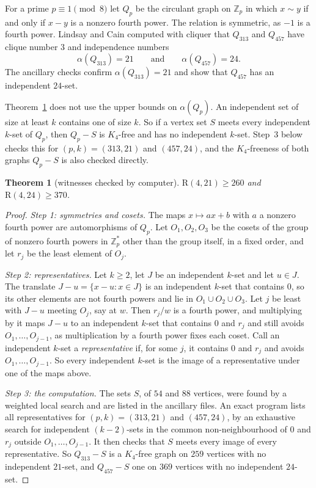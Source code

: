 \documentclass[11pt]{article}
\theoremstyle{spacedplain}
\newtheorem{theorem}{Theorem}[section]
\theoremstyle{spaceddef}
\theoremstyle{spacedremark}
\newcommand{\R}{\mathrm{R}}
\begin{document}
For a prime $p\equiv 1\pmod 8$ let $Q_p$ be the circulant graph on $\mathbb Z_p$ in which $x\sim y$ if and only if $x-y$ is a nonzero fourth power.
The relation is symmetric, as $-1$ is a fourth power.
Lindsay and Cain \cite[Proposition~2.1]{LinCa} computed with cliquer that $Q_{313}$ and $Q_{457}$ have clique number $3$ and independence numbers
\[
\alpha(Q_{313})=21 \qquad\text{and}\qquad \alpha(Q_{457})=24 .
\]
The ancillary checks confirm $\alpha(Q_{313})=21$ and show that $Q_{457}$ has an independent $24$-set.

Theorem~\ref{thm:r4k} does not use the upper bounds on $\alpha(Q_p)$.
An independent set of size at least $k$ contains one of size $k$.
So if a vertex set $S$ meets every independent $k$-set of $Q_p$, then $Q_p-S$ is $K_4$-free and has no independent $k$-set.
Step~3 below checks this for $(p,k)=(313,21)$ and $(457,24)$, and the $K_4$-freeness of both graphs $Q_p-S$ is also checked directly.

\begin{theorem}[witnesses checked by computer]\label{thm:r4k}
$\R(4,21)\ge 260$ and $\R(4,24)\ge 370$.
\end{theorem}

\begin{proof}
\emph{Step 1: symmetries and cosets.}
The maps $x\mapsto ax+b$ with $a$ a nonzero fourth power are automorphisms of $Q_p$.
Let $O_1,O_2,O_3$ be the cosets of the group of nonzero fourth powers in $\mathbb Z_p^*$ other than the group itself, in a fixed order, and let $r_j$ be the least element of $O_j$.

\emph{Step 2: representatives.}
Let $k\ge 2$, let $J$ be an independent $k$-set and let $u\in J$.
The translate $J-u=\{x-u:x\in J\}$ is an independent $k$-set that contains $0$, so its other elements are not fourth powers and lie in $O_1\cup O_2\cup O_3$.
Let $j$ be least with $J-u$ meeting $O_j$, say at $w$.
Then $r_j/w$ is a fourth power, and multiplying by it maps $J-u$ to an independent $k$-set that contains $0$ and $r_j$ and still avoids $O_1,\dots,O_{j-1}$, as multiplication by a fourth power fixes each coset.
Call an independent $k$-set a \emph{representative} if, for some $j$, it contains $0$ and $r_j$ and avoids $O_1,\dots,O_{j-1}$.
So every independent $k$-set is the image of a representative under one of the maps above.

\emph{Step 3: the computation.}
The sets $S$, of $54$ and $88$ vertices, were found by a weighted local search and are listed in the ancillary files.
An exact program lists all representatives for $(p,k)=(313,21)$ and $(457,24)$, by an exhaustive search for independent $(k-2)$-sets in the common non-neighbourhood of $0$ and $r_j$ outside $O_1,\dots,O_{j-1}$.
It then checks that $S$ meets every image of every representative.
So $Q_{313}-S$ is a $K_4$-free graph on $259$ vertices with no independent $21$-set, and $Q_{457}-S$ one on $369$ vertices with no independent $24$-set.
\end{proof}
\end{document}
